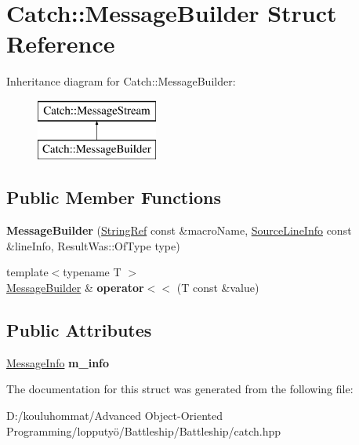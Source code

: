 \hypertarget{struct_catch_1_1_message_builder}{}\section{Catch\+:\+:Message\+Builder Struct Reference}
\label{struct_catch_1_1_message_builder}
Inheritance diagram for Catch\+:\+:Message\+Builder\+:\begin{figure}[H]
\begin{center}
\leavevmode
\includegraphics[height=2.000000cm]{struct_catch_1_1_message_builder}
\end{center}
\end{figure}
\subsection*{Public Member Functions}
\begin{DoxyCompactItemize}
\item 
\mbox{\label{struct_catch_1_1_message_builder_ac34832ca527a758f000ac233d32dd068}} 
{\bfseries Message\+Builder} (\mbox{\hyperlink{class_catch_1_1_string_ref}{String\+Ref}} const \&macro\+Name, \mbox{\hyperlink{struct_catch_1_1_source_line_info}{Source\+Line\+Info}} const \&line\+Info, Result\+Was\+::\+Of\+Type type)
\item 
\mbox{\label{struct_catch_1_1_message_builder_a20fa48d069b20dddcc2d3df8abb123c1}} 
{\footnotesize template$<$typename T $>$ }\\\mbox{\hyperlink{struct_catch_1_1_message_builder}{Message\+Builder}} \& {\bfseries operator$<$$<$} (T const \&value)
\end{DoxyCompactItemize}
\subsection*{Public Attributes}
\begin{DoxyCompactItemize}
\item 
\mbox{\label{struct_catch_1_1_message_builder_a979f1c2b36d78f80ee275bfa5ba0209f}} 
\mbox{\hyperlink{struct_catch_1_1_message_info}{Message\+Info}} {\bfseries m\+\_\+info}
\end{DoxyCompactItemize}


The documentation for this struct was generated from the following file\+:\begin{DoxyCompactItemize}
\item 
D\+:/kouluhommat/\+Advanced Object-\/\+Oriented Programming/lopputyö/\+Battleship/\+Battleship/catch.\+hpp\end{DoxyCompactItemize}

